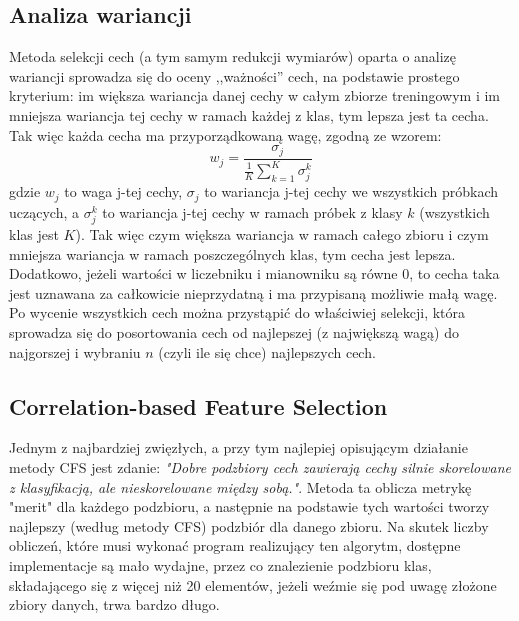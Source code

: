 \documentclass{classrep}
\begin{document}
{        \subsection{Analiza wariancji} {
            Metoda selekcji cech (a tym samym redukcji wymiarów) oparta o analizę
            wariancji sprowadza się do oceny ,,ważności'' cech, na podstawie prostego
            kryterium: im większa wariancja danej cechy w całym zbiorze treningowym i
            im mniejsza wariancja tej cechy w ramach każdej z klas, tym lepsza jest ta
            cecha. Tak więc każda cecha ma przyporządkowaną wagę, zgodną ze wzorem:
            \begin{equation}
                    w_j = \frac{\sigma_j}{\frac{1}{K} \sum_{k=1}^{K} \sigma_{j}^{k}}
            \end{equation}
            gdzie $w_j$ to waga j-tej cechy, $\sigma_j$ to wariancja j-tej cechy we
            wszystkich próbkach uczących, a $\sigma_{j}^{k}$ to wariancja j-tej cechy w
            ramach próbek z klasy $k$ (wszystkich klas jest $K$). Tak więc czym większa
            wariancja w ramach całego zbioru i czym mniejsza wariancja w ramach
            poszczególnych klas, tym cecha jest lepsza. Dodatkowo, jeżeli wartości w
            liczebniku i mianowniku są równe $0$, to cecha taka jest uznawana za
            całkowicie nieprzydatną i ma przypisaną możliwie małą wagę. Po wycenie
            wszystkich cech można przystąpić do właściwiej selekcji, która sprowadza
            się do posortowania cech od najlepszej (z największą wagą) do najgorszej i
            wybraniu $n$ (czyli ile się chce) najlepszych cech.
        }
     \subsection{Correlation-based Feature Selection} {
         Jednym z najbardziej zwięzłych, a przy tym najlepiej opisującym działanie
         metody CFS jest zdanie: \textit{"Dobre podzbiory cech zawierają cechy silnie
         skorelowane z klasyfikacją, ale nieskorelowane między sobą."}. Metoda ta
         oblicza metrykę "merit" dla każdego podzbioru, a następnie na podstawie tych
         wartości tworzy najlepszy (według metody CFS) podzbiór dla danego zbioru. Na
         skutek liczby obliczeń, które musi wykonać program realizujący ten algorytm,
         dostępne implementacje są mało wydajne, przez co znalezienie podzbioru klas,
         składającego się z więcej niż 20 elementów, jeżeli weźmie się pod uwagę
         złożone zbiory danych, trwa bardzo długo.
    }
}
\end{document}
